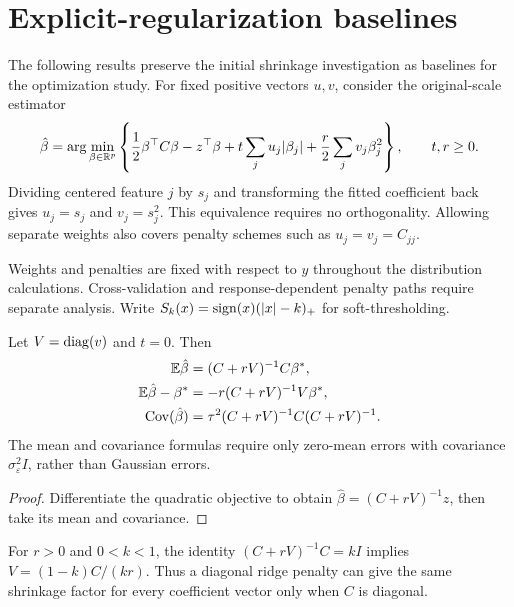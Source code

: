 \section{Explicit-regularization baselines}
\label{sec:regularization}

The following results preserve the initial shrinkage investigation as baselines
for the optimization study. For fixed positive vectors $u,v$, consider the
original-scale estimator
\begin{equation}
 \label{eq:objective}
 \hat\beta = \arg\min_{\beta \in \mathbb{R}^p} \left\{ \frac12\beta^\top C\beta - z^\top\beta + t\sum_j u_j|\beta_j| + \frac r2\sum_j v_j\beta_j^2 \right\}, \qquad t,r
           \ge 0.
\end{equation}
Dividing centered feature $j$ by $s_j$ and transforming the fitted coefficient
back gives $u_j = s_j$ and $v_j = s_j^2$. This equivalence requires no
orthogonality. Allowing separate weights also covers penalty schemes such as
$u_j = v_j = C_{jj}$.

Weights and penalties are fixed with respect to $y$ throughout the distribution
calculations. Cross-validation and response-dependent penalty paths require
separate analysis. Write $S_k(x) = \operatorname{sign}(x)(|x| - k)_+$ for
soft-thresholding.

\begin{proposition}
 \label{prop:ridge}
 Let $V = \operatorname{diag}(v)$ and $t = 0$. Then
 \begin{align*}
  \mathbb{E}\hat\beta           & = (C + rV)^{-1}C\beta^*,             \\
  \mathbb{E}\hat\beta - \beta^* & = -r(C + rV)^{-1}V\beta^*,           \\
  \operatorname{Cov}(\hat\beta)       & = \tau^2(C + rV)^{-1}C(C + rV)^{-1}.
 \end{align*}
 The mean and covariance formulas require only zero-mean errors with covariance
 $\sigma_\varepsilon^2 I$, rather than Gaussian errors.
\end{proposition}
\begin{proof}
 Differentiate the quadratic objective to obtain $\hat\beta = (C + rV)^{-1}z$,
 then take its mean and covariance.
\end{proof}
For $r > 0$ and $0 < k < 1$, the identity $(C + rV)^{-1}C = kI$ implies
$V = (1 - k)C/(kr)$. Thus a diagonal ridge penalty can give the same shrinkage
factor for every coefficient vector only when $C$ is diagonal.
